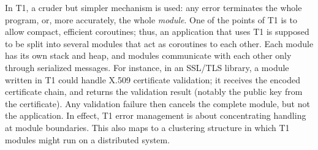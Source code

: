 \begin{rationale}
In T1, a cruder but simpler mechanism is used: any error terminates the
whole program, or, more accurately, the whole \emph{module}. One of the
points of T1 is to allow compact, efficient coroutines; thus, an
application that uses T1 is supposed to be split into several modules
that act as coroutines to each other. Each module has its own stack and
heap, and modules communicate with each other only through serialized
messages. For instance, in an SSL/TLS library, a module written in T1
could handle X.509 certificate validation; it receives the encoded
certificate chain, and returns the validation result (notably the public
key from the certificate). Any validation failure then cancels the
complete module, but not the application. In effect, T1 error management
is about concentrating handling at module boundaries. This also maps to
a clustering structure in which T1 modules might run on a distributed
system.

\end{rationale}
